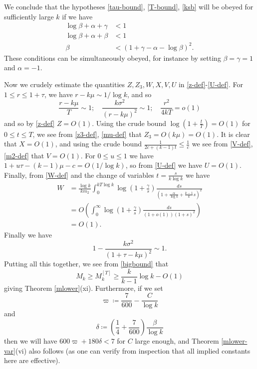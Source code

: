 We conclude that the hypotheses \eqref{tau-bound}, \eqref{T-bound}, \eqref{ksb} will be obeyed for sufficiently large $k$ if we have
\begin{align*}
\log \beta + \alpha + \gamma &< 1 \\
\log \beta + \alpha + \beta &< 1 \\
\beta &< (1 + \gamma - \alpha - \log \beta)^2.
\end{align*}
These conditions can be simultaneously obeyed, for instance by setting $\beta=\gamma=1$ and $\alpha = -1$.

Now we crudely estimate the quantities $Z,Z_3,W,X,V,U$ in \eqref{z-def}-\eqref{U-def}.  For $1 \leq r \leq 1+\tau$, we have $r-k\mu \sim 1/\log k$, and so
$$ \frac{r-k\mu}{T} \sim 1; \quad \frac{k \sigma^2}{(r-k\mu)^2} \sim 1; \quad \frac{r^2}{4kT} = o(1)$$
and so by \eqref{z-def} $Z = O(1)$.  Using the crude bound $\log(1+\frac{t}{T}) = O(1)$ for $0 \leq t \leq T$, we see from \eqref{z3-def}, \eqref{mu-def} that $Z_3 = O( k \mu ) = O(1)$.  It is clear that $X = O(1)$, and using the crude bound $\frac{1}{2c+(k-1)t} \leq \frac{1}{c}$ we see from \eqref{V-def}, \eqref{m2-def} that $V = O(1)$.  For $0 \leq u \leq 1$ we have $1 + u\tau - (k-1)\mu - c = O(1/\log k)$, so from \eqref{U-def} we have $U=O(1)$.  Finally, from \eqref{W-def} and the change of variables $t = \frac{s}{k \log k}$ we have
\begin{align*}
W &= \frac{\log k}{k m_2} \int_0^{kT\log k} \log\left(1 + \frac{\gamma}{s}\right) \frac{ds}{(1 + \frac{\alpha}{\log k} + \frac{k-1}{k} s)^2} \\
&= O\left( \int_0^\infty \log\left(1+\frac{\gamma}{s}\right) \frac{ds}{(1+o(1))(1+s)^2} \right) \\
&= O(1).
\end{align*}
Finally we have
$$ 1 - \frac{k\sigma^2}{(1+\tau-k\mu)^2} \sim 1.$$
Putting all this together, we see from \eqref{bigbound} that
$$  M_k \geq M_k^{[T]} \geq \frac{k}{k-1} \log k -  O(1)$$
giving Theorem \ref{mlower}(xi).  Furthermore, if we set
$$ \varpi \coloneqq \frac{7}{600} - \frac{C}{\log k}$$
and
$$ \delta \coloneqq \left(\frac{1}{4} + \frac{7}{600}\right) \frac{\beta}{\log k}$$
then we will have $600 \varpi + 180 \delta < 7$ for $C$ large enough, and Theorem \ref{mlower-var}(vi) also follows (as one can verify from inspection that all implied constants here are effective).


